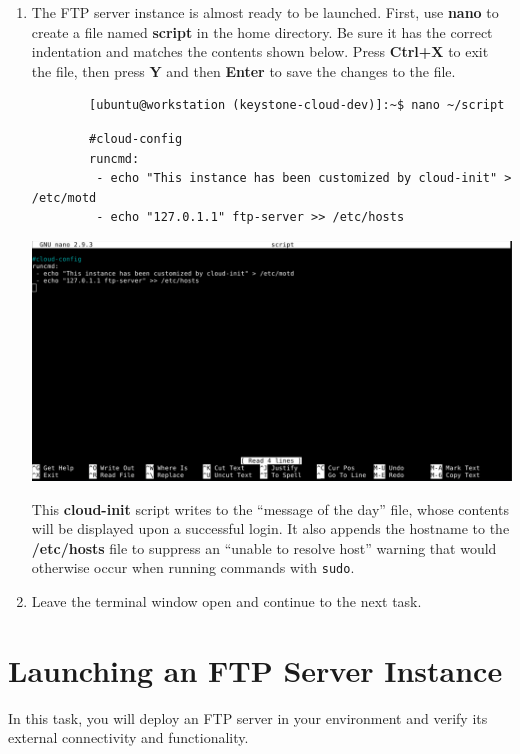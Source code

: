 \documentclass[letterpaper, 12pt]{article}
\begin{document}
\begin{enumerate}
    \item The FTP server instance is almost ready to be launched. First, use \textbf{nano} to create a file named
    \textbf{script} in the home directory. Be sure it has the correct indentation and matches the contents shown below.
    Press \textbf{Ctrl+X} to exit the file, then press \textbf{Y} and then \textbf{Enter} to save the changes to the
    file.
    \begin{lstlisting}
        [ubuntu@workstation (keystone-cloud-dev)]:~$ nano ~/script
    \end{lstlisting}
    \begin{lstlisting}
        #cloud-config
        runcmd:
         - echo "This instance has been customized by cloud-init" > /etc/motd
         - echo "127.0.1.1" ftp-server >> /etc/hosts
    \end{lstlisting}

    \begin{center}
        \includegraphics[width=\linewidth]{images/part1/step37.png}
    \end{center}

    \begin{notebox}
        This \textbf{cloud-init} script writes to the ``message of the day'' file, whose contents will be displayed
        upon a successful login. It also appends the hostname to the \textbf{/etc/hosts} file to suppress an ``unable to
        resolve host'' warning that would otherwise occur when running commands with \texttt{sudo}.
    \end{notebox}

    \item Leave the terminal window open and continue to the next task.
\end{enumerate}

\section{Launching an FTP Server Instance}
\label{sec:launch_an_ftp_server_instance}
In this task, you will deploy an FTP server in your environment and verify its external connectivity and functionality.
\end{document}
